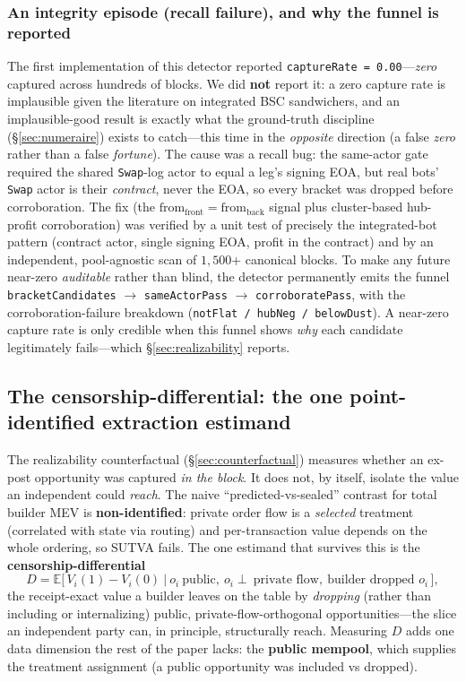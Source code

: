 \documentclass[11pt]{article}
\newcommand{\code}[1]{\texttt{#1}}
\begin{document}
\subsubsection{An integrity episode (recall failure), and why the funnel is reported}
The first implementation of this detector reported \code{captureRate = 0.00}---\emph{zero}
captured across hundreds of blocks. We did \textbf{not} report it: a zero capture rate
is implausible given the literature on integrated BSC sandwichers, and an
implausible-good result is exactly what the ground-truth discipline
(\S\ref{sec:numeraire}) exists to catch---this time in the \emph{opposite} direction
(a false \emph{zero} rather than a false \emph{fortune}). The cause was a recall bug:
the same-actor gate required the shared \code{Swap}-log actor to equal a leg's signing
EOA, but real bots' \code{Swap} actor is their \emph{contract}, never the EOA, so every
bracket was dropped before corroboration. The fix (the
$\text{from}_{\text{front}}=\text{from}_{\text{back}}$ signal plus cluster-based
hub-profit corroboration) was verified by a unit test of precisely the integrated-bot
pattern (contract actor, single signing EOA, profit in the contract) and by an
independent, pool-agnostic scan of $1{,}500$+ canonical blocks. To make any future
near-zero \emph{auditable} rather than blind, the detector permanently emits the funnel
\code{bracketCandidates} $\to$ \code{sameActorPass} $\to$ \code{corroboratePass}, with
the corroboration-failure breakdown (\code{notFlat / hubNeg / belowDust}). A near-zero
capture rate is only credible when this funnel shows \emph{why} each candidate
legitimately fails---which \S\ref{sec:realizability} reports.

\subsection{The censorship-differential: the one point-identified extraction estimand}
\label{sec:censorship-method}
The realizability counterfactual (\S\ref{sec:counterfactual}) measures whether an
ex-post opportunity was captured \emph{in the block}. It does not, by itself, isolate
the value an independent could \emph{reach}. The naive ``predicted-vs-sealed'' contrast
for total builder MEV is \textbf{non-identified}: private order flow is a \emph{selected}
treatment (correlated with state via routing) and per-transaction value depends on the
whole ordering, so SUTVA fails. The one estimand that survives this is the
\textbf{censorship-differential}
\begin{equation}
D = \mathbb{E}\big[\,V_i(1)-V_i(0)\ \big|\ o_i\ \text{public},\ o_i\perp\ \text{private flow},\ \text{builder dropped } o_i\,\big],
\end{equation}
the receipt-exact value a builder leaves on the table by \emph{dropping} (rather than
including or internalizing) public, private-flow-orthogonal opportunities---the slice an
independent party can, in principle, structurally reach. Measuring $D$ adds one data
dimension the rest of the paper lacks: the \textbf{public mempool}, which supplies the
treatment assignment (a public opportunity was included vs dropped).
\end{document}
